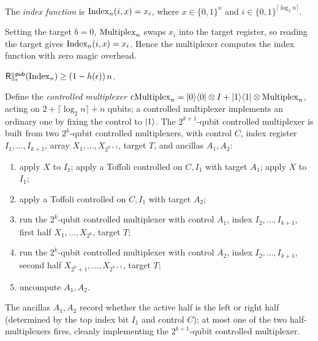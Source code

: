 \begin{definition}
  \label{def:index}
  The \emph{index function} is $\mathrm{Index}_n(i,x) = x_i$, where $x\in\{0,1\}^n$ and
  $i\in\{0,1\}^{\lceil\log_2 n\rceil}$.
\end{definition}

\begin{construction}
  \label{constr:multiplexer-index}
  Setting the target $b = 0$, $\mathrm{Multiplex}_n$ swaps $x_i$ into the target
  register, so reading the target gives $\mathrm{Index}_n(i,x) = x_i$. Hence the
  multiplexer computes the index function with zero magic overhead.
\end{construction}

\begin{lemma}
  \label{lem:index-rac}
  \notready
  $\mathsf{R}\|^{\mathsf{pub}}_\epsilon(\mathrm{Index}_n) \ge (1-h(\epsilon))\,n$.
\end{lemma}

\begin{construction}
  \label{constr:controlled-multiplexer}
  Define the \emph{controlled multiplexer}
  $\mathrm{cMultiplex}_n = \lvert 0\rangle\langle 0\rvert\otimes I + \lvert 1\rangle\langle 1\rvert\otimes
  \mathrm{Multiplex}_n$, acting on $2 + \lceil\log_2 n\rceil + n$ qubits; a controlled
  multiplexer implements an ordinary one by fixing the control to $\lvert 1\rangle$. The
  $2^{k+1}$-qubit controlled multiplexer is built from two $2^{k}$-qubit
  controlled multiplexers, with control $C$, index register
  $I_1,\dots,I_{k+1}$, array $X_1,\dots,X_{2^{k+1}}$, target $T$, and ancillas
  $A_1,A_2$:
  \begin{enumerate}
    \item apply $X$ to $I_1$; apply a Toffoli controlled on $C, I_1$ with target
      $A_1$; apply $X$ to $I_1$;
    \item apply a Toffoli controlled on $C, I_1$ with target $A_2$;
    \item run the $2^k$-qubit controlled multiplexer with control $A_1$, index
      $I_2,\dots,I_{k+1}$, first half $X_1,\dots,X_{2^k}$, target $T$;
    \item run the $2^k$-qubit controlled multiplexer with control $A_2$, index
      $I_2,\dots,I_{k+1}$, second half $X_{2^k+1},\dots,X_{2^{k+1}}$, target $T$;
    \item uncompute $A_1, A_2$.
  \end{enumerate}
  The ancillas $A_1, A_2$ record whether the active half is the left or right
  half (determined by the top index bit $I_1$ and control $C$); at most one of the
  two half-multiplexers fires, cleanly implementing the $2^{k+1}$-qubit controlled
  multiplexer.
\end{construction}

